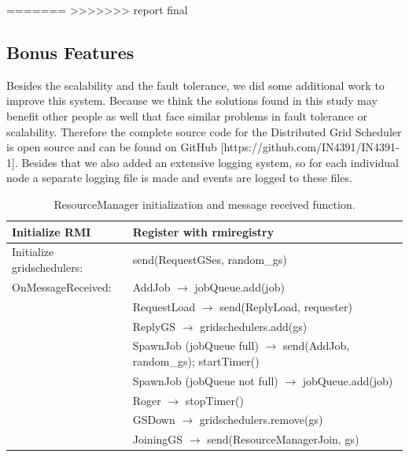 \documentclass[twocolumn,a4paper]{article}
\begin{document}
=======
>>>>>>> report final
\subsection{Bonus Features}
Besides the scalability and the fault tolerance, we did some additional work to improve this system. Because we think the solutions found in this study may benefit other people as well that face similar problems in fault tolerance or scalability. Therefore the complete source code for the Distributed Grid Scheduler is open source and can be found on GitHub [https://github.com/IN4391/IN4391-1]. Besides that we also added an extensive logging system, so for each individual node a separate logging file is made and events are logged to these files.

\begin{table}
\begin{tabular}{ |l|l| }
  \hline
  Initialize RMI & Register with rmiregistry \\
  \hline
  Initialize gridschedulers: & send(RequestGSes, random\_gs) \\
  \hline
  OnMessageReceived: & AddJob $\rightarrow$ jobQueue.add(job) \\
  & RequestLoad $\rightarrow$ send(ReplyLoad, requester) \\
  & ReplyGS $\rightarrow$ gridschedulers.add(gs) \\
  & SpawnJob (jobQueue full) $\rightarrow$ send(AddJob, random\_gs); startTimer() \\
  & SpawnJob (jobQueue not full) $\rightarrow$ jobQueue.add(job) \\
  & Roger $\rightarrow$ stopTimer() \\
  & GSDown $\rightarrow$  gridschedulers.remove(gs) \\
  & JoiningGS $\rightarrow$ send(ResourceManagerJoin, gs) \\
  \hline
\end{tabular}
\caption{ResourceManager initialization and message received function.}
\end{table}
\end{document}
